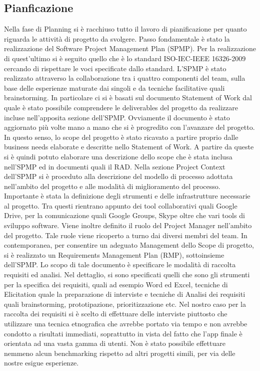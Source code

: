 \subsection{Pianficazione}
Nella fase di Planning si è racchiuso tutto il lavoro di pianificazione per quanto riguarda le attività di progetto da svolgere. Passo fondamentale è stato la realizzazione del Software Project Management Plan (SPMP). Per la realizzazione di quest’ultimo si è seguito quello che è lo standard ISO-IEC-IEEE 16326-2009 cercando di rispettare le voci specificate dallo standard.
L’SPMP è stato realizzato attraverso la collaborazione tra i quattro componenti del team, sulla base delle esperienze maturate dai singoli e da tecniche facilitative quali brainstorming.
In particolare ci si è basati sul documento Statement of Work dal quale è stato possibile comprendere le deliverables del progetto da realizzare incluse nell’apposita sezione dell’SPMP.
Ovviamente il documento è stato aggiornato più volte mano a mano che si è progredito con l’avanzare del progetto. In questo senso, lo scope del progetto è stato ricavato a partire proprio dalle business needs elaborate e descritte nello Statement of Work. 
A partire da queste si è quindi potuto elaborare una descrizione dello scope che è stata inclusa nell’SPMP ed in documenti quali il RAD.
Nella sezione Project Context dell’SPMP si è proceduto alla descrizione del modello di processo adottata nell’ambito del progetto e alle modalità di miglioramento del processo.
Importante è stata la definizione degli strumenti e delle infrastrutture necessarie al progetto. Tra questi rientrano appunto dei tool collaborativi quali Google Drive, per la comunicazione quali Google Groups, Skype oltre che vari tools di sviluppo software.
Viene inoltre definito il ruolo del Project Manager nell’ambito del progetto. Tale ruole viene ricoperto a turno dai diversi membri del team.
In contemporanea, per consentire un adeguato Management dello Scope di progetto, si è realizzato un Requirements Management Plan (RMP), sottoinsieme dell’SPMP. Lo scopo di tale documento è specificare le modalità di raccolta requisiti ed analisi. 
Nel dettaglio, si sono specificati quelli che sono gli strumenti per la specifica dei requisiti, quali ad esempio Word ed Excel, tecniche di Elicitation quale la preparazione di interviste e tecniche di Analisi dei requisiti quali brainstorming, prototipazione, prioritizzazione etc.
Nel nostro caso per la raccolta dei requisiti si è scelto di effettuare delle interviste piuttosto che utilizzare una tecnica etnografica che avrebbe portato via tempo e non avrebbe condotto a risultati immediati, soprattutto in vista del fatto che l’app finale è orientata ad una vasta gamma di utenti. Non è stato possibile effettuare nemmeno alcun benchmarking rispetto ad altri progetti simili, per via delle nostre esigue esperienze.
